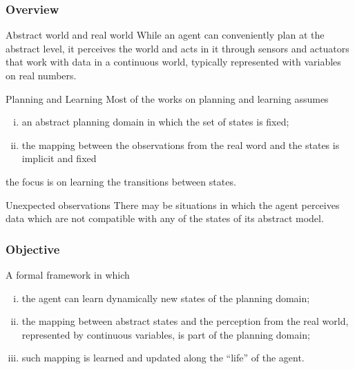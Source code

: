\documentclass{beamer}
\begin{document}
\begin{frame}\small
  \frametitle{Overview}
  \begin{block}{Abstract world and real world}
   While an agent can conveniently plan at the
  \alert{abstract level}, it perceives the world and acts in it through
  sensors and actuators that work with data in a \alert{continuous world},
  typically represented with variables on real numbers.
  \end{block}\pause 
  \begin{block}{Planning and Learning}
      Most of the works on planning and learning assumes
      \begin{enumerate}[(i)]
      \item an abstract planning domain in which the set of states is fixed;
      \item the mapping between the observations
        from the real word and the states is implicit and fixed
      \end{enumerate}
    the focus is on \alert{learning the transitions} between
    states.
  \end{block}\pause 
  \begin{block}{Unexpected observations}
    There may be situations in which the agent perceives 
    {\color {red} data which are not compatible} with any of the states of its abstract
    model. 
  \end{block}
\end{frame}

\begin{frame}
  \frametitle{Objective}
  
A formal framework in which

\begin{enumerate}[(i)]
    \item  the agent can {\color {red} learn dynamically new states} of the planning domain;
    \item the {\color {red} mapping} between abstract {\color {red} states} and the {\color {red} perception} from the real world, represented by {\color {red} continuous variables}, is part of the planning domain; 
    \item
    such {\color {red} mapping is learned} and updated along the “life” of the agent.  
\end{enumerate}

\end{frame}
\end{document}
